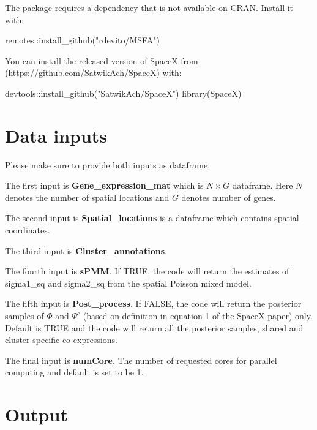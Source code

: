 \documentclass[
]{book}
\newenvironment{Shaded}{\begin{snugshade}}{\end{snugshade}}
\newcommand{\FunctionTok}[1]{\textcolor[rgb]{0.00,0.00,0.00}{#1}}
\newcommand{\NormalTok}[1]{#1}
\newcommand{\SpecialCharTok}[1]{\textcolor[rgb]{0.00,0.00,0.00}{#1}}
\newcommand{\StringTok}[1]{\textcolor[rgb]{0.31,0.60,0.02}{#1}}
\begin{document}
The package requires a dependency that is not available on CRAN. Install it with:

\begin{Shaded}
\begin{Highlighting}[]
\NormalTok{remotes}\SpecialCharTok{::}\FunctionTok{install\_github}\NormalTok{(}\StringTok{"rdevito/MSFA"}\NormalTok{)}
\end{Highlighting}
\end{Shaded}

You can install the released version of SpaceX from (\url{https://github.com/SatwikAch/SpaceX}) with:

\begin{Shaded}
\begin{Highlighting}[]
\NormalTok{devtools}\SpecialCharTok{::}\FunctionTok{install\_github}\NormalTok{(}\StringTok{"SatwikAch/SpaceX"}\NormalTok{)}
\FunctionTok{library}\NormalTok{(SpaceX)}
\end{Highlighting}
\end{Shaded}

\hypertarget{data-inputs}{%
\section{Data inputs}\label{data-inputs}}

Please make sure to provide both inputs as dataframe.

The first input is \textbf{Gene\_expression\_mat} which is \(N \times G\) dataframe. Here \(N\) denotes the number of spatial locations and \(G\) denotes number of genes.

The second input is \textbf{Spatial\_locations} is a dataframe which contains spatial coordinates.

The third input is \textbf{Cluster\_annotations}.

The fourth input is \textbf{sPMM}. If TRUE, the code will return the estimates of sigma1\_sq and sigma2\_sq from the spatial Poisson mixed model.

The fifth input is \textbf{Post\_process}. If FALSE, the code will return the posterior samples of \(\Phi\) and \(\Psi^c\) (based on definition in equation 1 of the SpaceX paper) only. Default is TRUE and the code will return all the posterior samples, shared and cluster specific co-expressions.

The final input is \textbf{numCore}. The number of requested cores for parallel computing and default is set to be 1.

\hypertarget{output}{%
\section{Output}\label{output}}
\end{document}

